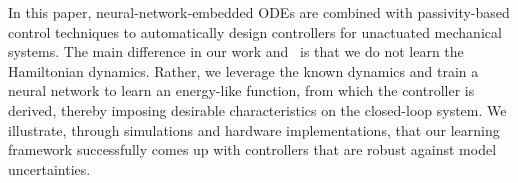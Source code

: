In this paper, neural-network-embedded ODEs are combined with passivity-based
control techniques to automatically design controllers for unactuated mechanical
systems.
%
The main difference in our work and~\citet{zhong2019symplectic} is that we do not
learn the Hamiltonian dynamics. 
%
Rather, we leverage the known dynamics and train a neural network to learn an
energy-like function, from which the controller is derived, thereby imposing
desirable characteristics on the closed-loop system.
%
We illustrate, through simulations and hardware implementations, that our
learning framework successfully comes up with controllers that
are robust against model uncertainties.
%
%

